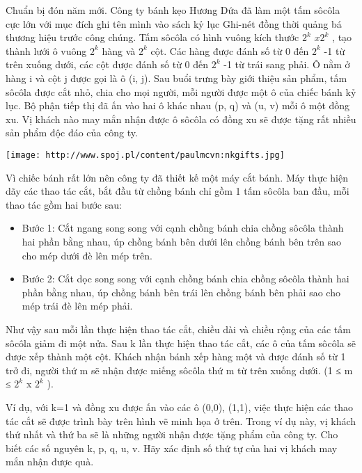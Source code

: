 Chuẩn bị đón năm mới. Công ty bánh kẹo Hương Dứa đã làm một tấm sôcôla cực lớn với mục đích ghi tên mình vào sách kỷ lục Ghi-nét đồng thời quảng bá thương hiệu trước công chúng. Tấm sôcôla có hình vuông kích thước $2^{k}$ $x2^{k}$ , tạo thành lưới ô vuông $2^{k}$ hàng và $2^{k}$ cột. Các hàng được đánh số từ 0 đến $2^{k}$ -1 từ trên xuống dưới, các cột được đánh số từ 0 đến $2^{k}$ -1 từ trái sang phải. Ô nằm ở hàng i và cột j được gọi là ô (i, j). Sau buổi trưng bày giới thiệu sản phẩm, tấm sôcôla được cắt nhỏ, chia cho mọi người, mỗi người được một ô của chiếc bánh kỷ lục. Bộ phận tiếp thị đã ấn vào hai ô khác nhau (p, q) và (u, v) mỗi ô một đồng xu. Vị khách nào may mắn nhận được ô sôcôla có đồng xu sẽ được tặng rất nhiều sản phẩm độc đáo của công ty.


\texttt{[image: http://www.spoj.pl/content/paulmcvn:nkgifts.jpg]}

Vì chiếc bánh rất lớn nên công ty đã thiết kế một máy cắt bánh. Máy thực hiện dãy các thao tác cắt, bắt đầu từ chồng bánh chỉ gồm 1 tấm sôcôla ban đầu, mỗi thao tác gồm hai bước sau:
\begin{itemize}
	\item Bước 1: Cắt ngang song song với cạnh chồng bánh chia chồng sôcôla thành hai phần bằng nhau, úp chồng bánh bên dưới lên chồng bánh bên trên sao cho mép dưới đè lên mép trên.
	\item Bước 2: Cắt dọc song song với cạnh chồng bánh chia chồng sôcôla thành hai phần bằng nhau, úp chồng bánh bên trái lên chồng bánh bên phải sao cho mép trái đè lên mép phải.
\end{itemize}

Như vậy sau mỗi lần thực hiện thao tác cắt, chiều dài và chiều rộng của các tấm sôcôla giảm đi một nửa. Sau k lần thực hiện thao tác cắt, các ô của tấm sôcôla sẽ được xếp thành một cột. Khách nhận bánh xếp hàng một và được đánh số từ 1 trở đi, người thứ m sẽ nhận được miếng sôcôla thứ m từ trên xuống dưới. (1 ≤ m ≤ $2^{k}$ x $2^{k}$ ).

Ví dụ, với k=1 và đồng xu được ấn vào các ô (0,0), (1,1), việc thực hiện các thao tác cắt sẽ được trình bày trên hình vẽ minh họa ở trên. Trong ví dụ này, vị khách thứ nhất và thứ ba sẽ là những người nhận được tặng phẩm của công ty.
Cho biết các số nguyên k, p, q, u, v. Hãy xác định số thứ tự của hai vị khách may mắn nhận được quà.